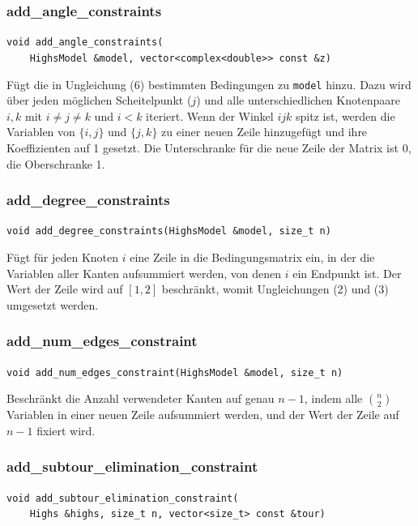 \documentclass[a4paper, 10pt, ngerman]{article}
\begin{document}
\subsubsection{add\_angle\_constraints}
\verb|void add_angle_constraints(| \\
\verb|    HighsModel &model, vector<complex<double>> const &z)|
\medskip

\noindent Fügt die in Ungleichung (6) bestimmten Bedingungen zu \verb|model| hinzu. Dazu wird über jeden möglichen Scheitelpunkt ($j$) und alle unterschiedlichen Knotenpaare $i, k$ mit $i \ne j \ne k$ und $i < k$ iteriert. Wenn der Winkel $ijk$ spitz ist, werden die Variablen von $\{i, j\}$ und $\{j, k\}$ zu einer neuen Zeile hinzugefügt und ihre Koeffizienten auf 1 gesetzt. Die Unterschranke für die neue Zeile der Matrix ist 0, die Oberschranke 1.

\subsubsection{add\_degree\_constraints}
\verb|void add_degree_constraints(HighsModel &model, size_t n)|
\medskip

\noindent Fügt für jeden Knoten $i$ eine Zeile in die Bedingungsmatrix ein, in der die Variablen aller Kanten aufsummiert werden, von denen $i$ ein Endpunkt ist. Der Wert der Zeile wird auf $[1, 2]$ beschränkt, womit Ungleichungen (2) und (3) umgesetzt werden.

\subsubsection{add\_num\_edges\_constraint}
\verb|void add_num_edges_constraint(HighsModel &model, size_t n)|
\medskip

\noindent Beschränkt die Anzahl verwendeter Kanten auf genau $n - 1$, indem alle $\binom n 2$ Variablen in einer neuen Zeile aufsummiert werden, und der Wert der Zeile auf $n - 1$ fixiert wird.

\subsubsection{add\_subtour\_elimination\_constraint}
\verb|void add_subtour_elimination_constraint(| \\
\verb|    Highs &highs, size_t n, vector<size_t> const &tour)|
\medskip
\end{document}
